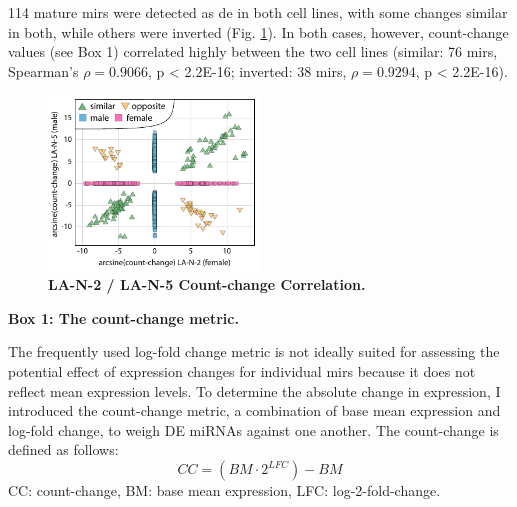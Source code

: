 
114 mature \acp{mir} were detected as \ac{de} in both cell lines, with some changes similar in both, while others were inverted (Fig. \ref{fig:countchangecor}). In both cases, however, count-change values (see Box 1) correlated highly between the two cell lines (similar: 76 \acp{mir}, Spearman’s $\rho = 0.9066$, p < 2.2E-16; inverted: 38 \acp{mir}, $\rho = 0.9294$, p < 2.2E-16).

\begin{figure}
\centering
\includegraphics[width=0.5\textwidth]{figures/countchangecor}
\caption[LA-N-2 / LA-N-5 Count-change Correlation.]{\textbf{LA-N-2 / LA-N-5 Count-change Correlation.}
\label{fig:countchangecor}}
\end{figure}

\begin{shaded}
\textbf{Box 1: The count-change metric.}

The frequently used log-fold change metric is not ideally suited for assessing the potential effect of expression changes for individual \acp{mir} because it does not reflect mean expression levels. To determine the absolute change in expression, I introduced the count-change metric, a combination of base mean expression and log-fold change, to weigh DE miRNAs against one another. The count-change is defined as follows: $$CC = (BM \cdot 2^{LFC}) - BM$$
CC: count-change, BM: base mean expression, LFC: log-2-fold-change.
\end{shaded}

